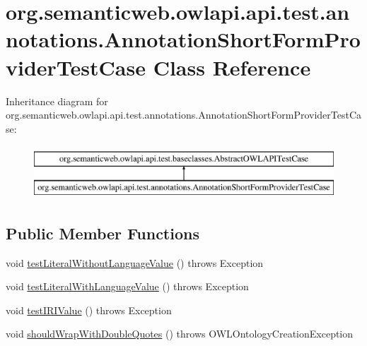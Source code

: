 \hypertarget{classorg_1_1semanticweb_1_1owlapi_1_1api_1_1test_1_1annotations_1_1_annotation_short_form_provider_test_case}{\section{org.\-semanticweb.\-owlapi.\-api.\-test.\-annotations.\-Annotation\-Short\-Form\-Provider\-Test\-Case Class Reference}
\label{classorg_1_1semanticweb_1_1owlapi_1_1api_1_1test_1_1annotations_1_1_annotation_short_form_provider_test_case}
}
Inheritance diagram for org.\-semanticweb.\-owlapi.\-api.\-test.\-annotations.\-Annotation\-Short\-Form\-Provider\-Test\-Case\-:\begin{figure}[H]
\begin{center}
\leavevmode
\includegraphics[height=2.000000cm]{classorg_1_1semanticweb_1_1owlapi_1_1api_1_1test_1_1annotations_1_1_annotation_short_form_provider_test_case}
\end{center}
\end{figure}
\subsection*{Public Member Functions}
\begin{DoxyCompactItemize}
\item 
void \hyperlink{classorg_1_1semanticweb_1_1owlapi_1_1api_1_1test_1_1annotations_1_1_annotation_short_form_provider_test_case_a29c0659c4c6791cfe9a518c9b340876c}{test\-Literal\-Without\-Language\-Value} ()  throws Exception 
\item 
void \hyperlink{classorg_1_1semanticweb_1_1owlapi_1_1api_1_1test_1_1annotations_1_1_annotation_short_form_provider_test_case_a69c18d143490d84c2cc65d9d113f99ef}{test\-Literal\-With\-Language\-Value} ()  throws Exception 
\item 
void \hyperlink{classorg_1_1semanticweb_1_1owlapi_1_1api_1_1test_1_1annotations_1_1_annotation_short_form_provider_test_case_ae84eaba364b248e9817219ccb1064667}{test\-I\-R\-I\-Value} ()  throws Exception 
\item 
void \hyperlink{classorg_1_1semanticweb_1_1owlapi_1_1api_1_1test_1_1annotations_1_1_annotation_short_form_provider_test_case_a179b532d0382a55b00e073a5b0167d95}{should\-Wrap\-With\-Double\-Quotes} ()  throws O\-W\-L\-Ontology\-Creation\-Exception 
\end{DoxyCompactItemize}
